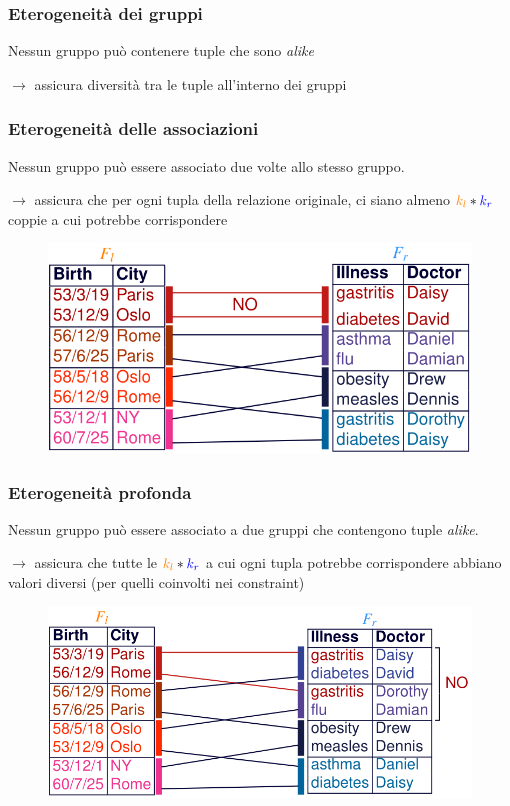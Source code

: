 \documentclass{report}
\begin{document}
\subsubsection{Eterogeneità dei gruppi}
Nessun gruppo può contenere tuple che sono \textit{alike} 

$\rightarrow$ assicura diversità tra le tuple all'interno dei gruppi

\subsubsection{Eterogeneità delle associazioni}
Nessun gruppo può essere associato due volte allo stesso gruppo.

$\rightarrow$ assicura che per ogni tupla della relazione originale, ci siano almeno 
$\textcolor{orange}{k_l} * \textcolor{blue}{k_r}$ coppie a cui potrebbe corrispondere

\begin{figure}[ht]
    \centering
    \includegraphics[width=0.7\linewidth]{images/publ-obf-ass/ass-hetero.png}
\end{figure}

\newpage
\subsubsection{Eterogeneità profonda}
Nessun gruppo può essere associato a due gruppi che contengono tuple \textit{alike}.

$\rightarrow$ assicura che tutte le $\textcolor{orange}{k_l} * \textcolor{blue}{k_r}$ 
a cui ogni tupla potrebbe corrispondere abbiano valori diversi (per quelli coinvolti nei constraint)

\begin{figure}[ht]
    \centering
    \includegraphics[width=0.8\linewidth]{images/publ-obf-ass/deep-hetero.png}
\end{figure}
\end{document}
